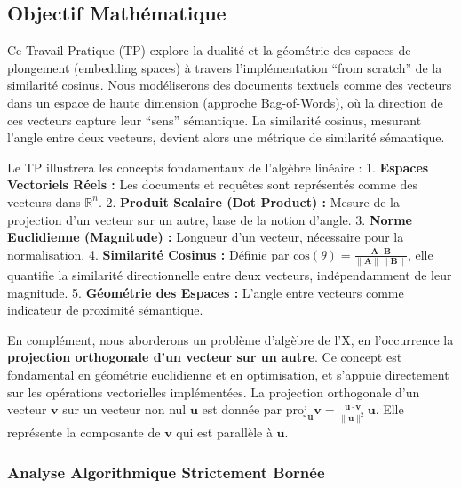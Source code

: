 \documentclass[11pt,a4paper]{report}
\begin{document}
\hypertarget{objectif-mathuxe9matique}{%
\subsection{Objectif Mathématique}\label{objectif-mathuxe9matique}}

Ce Travail Pratique (TP) explore la dualité et la géométrie des espaces
de plongement (embedding spaces) à travers l'implémentation ``from
scratch'' de la similarité cosinus. Nous modéliserons des documents
textuels comme des vecteurs dans un espace de haute dimension (approche
Bag-of-Words), où la direction de ces vecteurs capture leur ``sens''
sémantique. La similarité cosinus, mesurant l'angle entre deux vecteurs,
devient alors une métrique de similarité sémantique.

Le TP illustrera les concepts fondamentaux de l'algèbre linéaire : 1.
\textbf{Espaces Vectoriels Réels :} Les documents et requêtes sont
représentés comme des vecteurs dans \(\mathbb{R}^n\). 2. \textbf{Produit
Scalaire (Dot Product) :} Mesure de la projection d'un vecteur sur un
autre, base de la notion d'angle. 3. \textbf{Norme Euclidienne
(Magnitude) :} Longueur d'un vecteur, nécessaire pour la normalisation.
4. \textbf{Similarité Cosinus :} Définie par
\(\text{cos}(\theta) = \frac{\mathbf{A} \cdot \mathbf{B}}{\|\mathbf{A}\| \|\mathbf{B}\|}\),
elle quantifie la similarité directionnelle entre deux vecteurs,
indépendamment de leur magnitude. 5. \textbf{Géométrie des Espaces :}
L'angle entre vecteurs comme indicateur de proximité sémantique.

En complément, nous aborderons un problème d'algèbre de l'X, en
l'occurrence la \textbf{projection orthogonale d'un vecteur sur un
autre}. Ce concept est fondamental en géométrie euclidienne et en
optimisation, et s'appuie directement sur les opérations vectorielles
implémentées. La projection orthogonale d'un vecteur \(\mathbf{v}\) sur
un vecteur non nul \(\mathbf{u}\) est donnée par
\(\text{proj}_{\mathbf{u}} \mathbf{v} = \frac{\mathbf{u} \cdot \mathbf{v}}{\|\mathbf{u}\|^2} \mathbf{u}\).
Elle représente la composante de \(\mathbf{v}\) qui est parallèle à
\(\mathbf{u}\).

\hypertarget{analyse-algorithmique-strictement-bornuxe9e}{%
\subsubsection{Analyse Algorithmique Strictement
Bornée}\label{analyse-algorithmique-strictement-bornuxe9e}}
\end{document}
